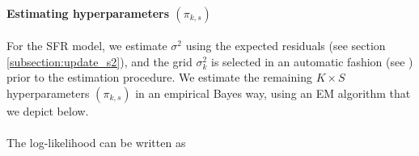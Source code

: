  

 \paragraph{Estimating hyperparameters $(\pi_{k,s}) $} \label{appendix:EB_SFR}
For the  SFR model, we estimate $\sigma^2$ using the expected residuals (see section \ref{subsection:update_s2}), and the grid $\sigma_k^2$ is selected in an automatic fashion (see \cite{stephens_false_2017}) prior to the estimation procedure. We estimate the remaining $K\times S$  hyperparameters $(\pi_{k,s})$ in an empirical Bayes way, using an  EM algorithm that we depict  below.\\\\ 



The log-likelihood can be written as
 
